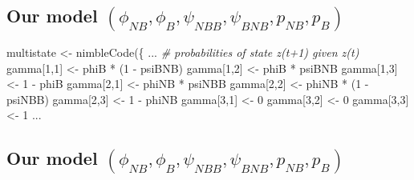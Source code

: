\documentclass[
  12pt,
]{krantz}
\newenvironment{Shaded}{\begin{snugshade}}{\end{snugshade}}
\newcommand{\CommentTok}[1]{\textcolor[rgb]{0.56,0.35,0.01}{\textit{#1}}}
\newcommand{\DecValTok}[1]{\textcolor[rgb]{0.00,0.00,0.81}{#1}}
\newcommand{\FunctionTok}[1]{\textcolor[rgb]{0.00,0.00,0.00}{#1}}
\newcommand{\NormalTok}[1]{#1}
\newcommand{\OtherTok}[1]{\textcolor[rgb]{0.56,0.35,0.01}{#1}}
\newcommand{\SpecialCharTok}[1]{\textcolor[rgb]{0.00,0.00,0.00}{#1}}
\begin{document}
\hypertarget{our-model-phi_nb-phi_b-psi_nbb-psi_bnb-p_nb-p_b-2}{%
\subsection{\texorpdfstring{Our model \((\phi_{NB}, \phi_B, \psi_{NBB}, \psi_{BNB}, p_{NB}, p_B)\)}{Our model (\textbackslash phi\_\{NB\}, \textbackslash phi\_B, \textbackslash psi\_\{NBB\}, \textbackslash psi\_\{BNB\}, p\_\{NB\}, p\_B)}}\label{our-model-phi_nb-phi_b-psi_nbb-psi_bnb-p_nb-p_b-2}}

\begin{Shaded}
\begin{Highlighting}[]
\NormalTok{multistate }\OtherTok{\textless{}{-}} \FunctionTok{nimbleCode}\NormalTok{(\{}
\NormalTok{...}
  \CommentTok{\# probabilities of state z(t+1) given z(t)}
\NormalTok{  gamma[}\DecValTok{1}\NormalTok{,}\DecValTok{1}\NormalTok{] }\OtherTok{\textless{}{-}}\NormalTok{ phiB }\SpecialCharTok{*}\NormalTok{ (}\DecValTok{1} \SpecialCharTok{{-}}\NormalTok{ psiBNB)}
\NormalTok{  gamma[}\DecValTok{1}\NormalTok{,}\DecValTok{2}\NormalTok{] }\OtherTok{\textless{}{-}}\NormalTok{ phiB }\SpecialCharTok{*}\NormalTok{ psiBNB}
\NormalTok{  gamma[}\DecValTok{1}\NormalTok{,}\DecValTok{3}\NormalTok{] }\OtherTok{\textless{}{-}} \DecValTok{1} \SpecialCharTok{{-}}\NormalTok{ phiB}
\NormalTok{  gamma[}\DecValTok{2}\NormalTok{,}\DecValTok{1}\NormalTok{] }\OtherTok{\textless{}{-}}\NormalTok{ phiNB }\SpecialCharTok{*}\NormalTok{ psiNBB}
\NormalTok{  gamma[}\DecValTok{2}\NormalTok{,}\DecValTok{2}\NormalTok{] }\OtherTok{\textless{}{-}}\NormalTok{ phiNB }\SpecialCharTok{*}\NormalTok{ (}\DecValTok{1} \SpecialCharTok{{-}}\NormalTok{ psiNBB)}
\NormalTok{  gamma[}\DecValTok{2}\NormalTok{,}\DecValTok{3}\NormalTok{] }\OtherTok{\textless{}{-}} \DecValTok{1} \SpecialCharTok{{-}}\NormalTok{ phiNB}
\NormalTok{  gamma[}\DecValTok{3}\NormalTok{,}\DecValTok{1}\NormalTok{] }\OtherTok{\textless{}{-}} \DecValTok{0}
\NormalTok{  gamma[}\DecValTok{3}\NormalTok{,}\DecValTok{2}\NormalTok{] }\OtherTok{\textless{}{-}} \DecValTok{0}
\NormalTok{  gamma[}\DecValTok{3}\NormalTok{,}\DecValTok{3}\NormalTok{] }\OtherTok{\textless{}{-}} \DecValTok{1}
\NormalTok{...}
\end{Highlighting}
\end{Shaded}

\hypertarget{our-model-phi_nb-phi_b-psi_nbb-psi_bnb-p_nb-p_b-3}{%
\subsection{\texorpdfstring{Our model \((\phi_{NB}, \phi_B, \psi_{NBB}, \psi_{BNB}, p_{NB}, p_B)\)}{Our model (\textbackslash phi\_\{NB\}, \textbackslash phi\_B, \textbackslash psi\_\{NBB\}, \textbackslash psi\_\{BNB\}, p\_\{NB\}, p\_B)}}\label{our-model-phi_nb-phi_b-psi_nbb-psi_bnb-p_nb-p_b-3}}
\end{document}
